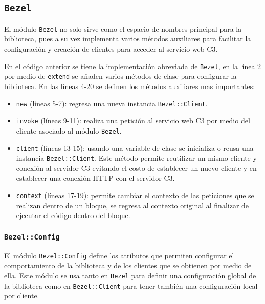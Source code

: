 \subsection{\texttt{Bezel}}

El módulo \texttt{Bezel} no solo sirve como el espacio de nombres principal para la
biblioteca, pues a su vez implementa varios métodos auxiliares para facilitar la
configuración y creación de clientes para acceder al servicio web C3.



En el código anterior se tiene la implementación abreviada de \texttt{Bezel},
en la línea 2 por medio de \texttt{extend} se añaden varios métodos de clase
para configurar la biblioteca. En las líneas 4-20 se definen los
métodos auxiliares mas importantes:

\begin{itemize}
\item \texttt{new} (líneas 5-7): regresa una nueva instancia \texttt{Bezel::Client}.
\item \texttt{invoke} (líneas 9-11): realiza una petición al servicio web C3
  por medio del cliente asociado al módulo \texttt{Bezel}.
\item \texttt{client} (líneas 13-15): usando una variable de clase se inicializa o
  reusa una instancia \texttt{Bezel::Client}. Este método permite reutilizar un
  mismo cliente y conexión al servidor C3 evitando el costo de establecer un
  nuevo cliente y en establecer una conexión HTTP con el servidor C3.
\item \texttt{context} (líneas 17-19): permite cambiar el contexto de las
  peticiones que se realizan dentro de un bloque, se regresa al contexto original
  al finalizar de ejecutar el código dentro del bloque.
\end{itemize}

\subsubsection{\texttt{Bezel::Config}}

El módulo \texttt{Bezel::Config} define los atributos que permiten configurar
el comportamiento de la biblioteca y de los clientes que se obtienen por medio
de ella. Este módulo se usa tanto en \texttt{Bezel} para definir una configuración
global de la biblioteca como en \texttt{Bezel::Client} para tener también una
configuración local por cliente.



